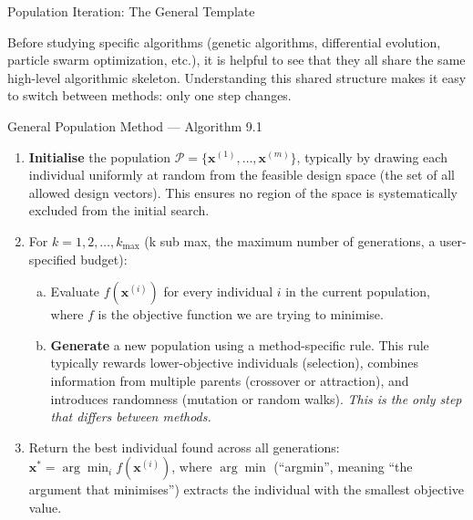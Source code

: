 \documentclass[aspectratio=169,10pt]{beamer}
\newcommand{\bx}{\mathbf{x}}
\begin{document}
\begin{frame}[allowframebreaks]{Population Iteration: The General Template}

  Before studying specific algorithms (genetic algorithms,
  differential evolution, particle swarm optimization, etc.), it is
  helpful to see that they all share the same high-level algorithmic
  skeleton.  Understanding this shared structure makes it easy to
  switch between methods: only one step changes.

  \begin{block}{General Population Method --- Algorithm 9.1}
    \begin{enumerate}
      \item \textbf{Initialise} the population
            $\mathcal{P} = \{\bx^{(1)}, \ldots, \bx^{(m)}\}$, typically
            by drawing each individual uniformly at random from the
            feasible design space (the set of all allowed design vectors).
            This ensures no region of the space is systematically
            excluded from the initial search.
      \item For $k = 1, 2, \ldots, k_{\max}$ (k sub max, the maximum
            number of generations, a user-specified budget):
        \begin{enumerate}[(a)]
          \item Evaluate $f(\bx^{(i)})$ for every individual $i$ in the
                current population, where $f$ is the objective function
                we are trying to minimise.
          \item \textbf{Generate} a new population using a
                method-specific rule.  This rule typically rewards
                lower-objective individuals (selection), combines
                information from multiple parents (crossover or
                attraction), and introduces randomness (mutation or
                random walks).  \emph{This is the only step that
                differs between methods.}
        \end{enumerate}
      \item Return the best individual found across all generations:
            $\bx^{*} = \arg\min_{i} f(\bx^{(i)})$, where $\arg\min$
            (``argmin'', meaning ``the argument that minimises'')
            extracts the individual with the smallest objective value.
    \end{enumerate}
  \end{block}


\end{frame}
\end{document}
